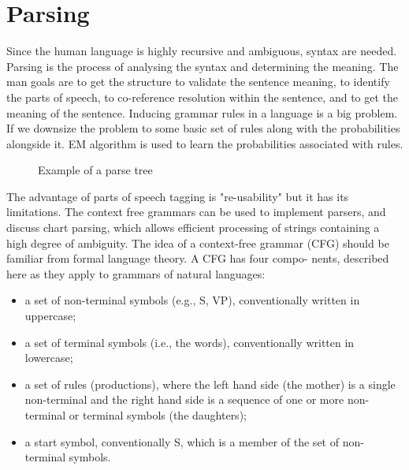 \documentclass{bmcart}
\begin{document}
\section{Parsing}
\label{sec:parsing}
Since the human language is highly recursive and ambiguous, syntax are needed. Parsing is the process of analysing the syntax and determining the meaning. The man goals are to get the structure to validate the sentence meaning, to identify the parts of speech, to co-reference resolution within the sentence, and to get the meaning of the sentence. Inducing grammar rules in a language is a big problem. If we downsize the problem to some basic set of rules along with the probabilities alongside it. EM algorithm is used to learn the probabilities associated with rules. 

\begin{figure}
		\centering
		\caption{Example of a parse tree}
		\label{fig:parseTree}
\end{figure}

The advantage of parts of speech tagging is "re-usability" but it has its limitations. The context free grammars can be used to implement parsers, and discuss chart parsing, which allows efficient processing of strings containing a high degree of ambiguity. The idea of a context-free grammar (CFG) should be familiar from formal language theory. A CFG has four compo- nents, described here as they apply to grammars of natural languages:
\begin{itemize}
\item a set of non-terminal symbols (e.g., S, VP), conventionally written in uppercase;
\item a set of terminal symbols (i.e., the words), conventionally written in lowercase;
\item  a set of rules (productions), where the left hand side (the mother) is a single non-terminal and the right hand side is a sequence of one or more non-terminal or terminal symbols (the daughters);
\item  a start symbol, conventionally S, which is a member of the set of non-terminal symbols.
\end{itemize}
\end{document}
